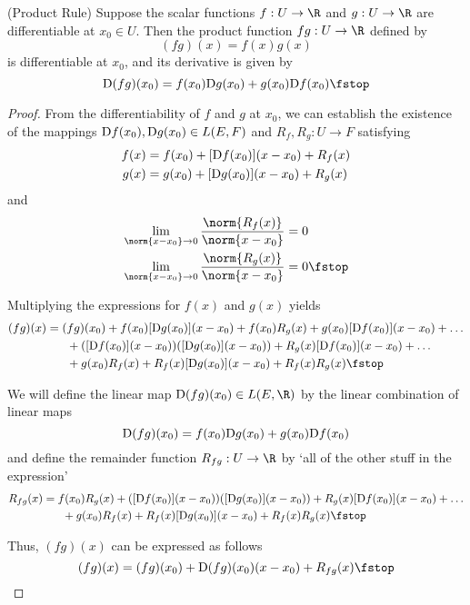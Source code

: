 \begin{theorem}
  (Product Rule) Suppose the scalar functions \( f:U\to\R \) and \( g:U\to\R \) are differentiable at \( x_0\in U \). Then the product function \( fg:U\to\R \) defined by
  \[ (fg)(x)=f(x)g(x) \]
  is differentiable at \( x_0 \), and its derivative is given by
  \[ \D(fg)(x_0)=f(x_0)\D g(x_0)+g(x_0)\D f(x_0)\fstop \]
\end{theorem}
\begin{proof}
    From the differentiability of \( f \) and \( g \) at \( x_0 \), we can establish the existence of the mappings \( \text{D} f(x_0),\text{D} g(x_0)\in L(E,F) \) and \( R_f,R_g:U\to F \) satisfying
  \begin{align*}
    f(x)&= f(x_0)+[\text{D} f(x_0)](x-x_0)+R_f(x)\\
    g(x)&= g(x_0)+[\text{D} g(x_0)](x-x_0)+R_g(x)
  \end{align*}
  and
  \begin{align*}
    \lim_{\norm{x-x_0}\to 0}\frac{\norm{R_f(x)}}{\norm{x-x_0}}&= 0\\
    \lim_{\norm{x-x_0}\to 0}\frac{\norm{R_g(x)}}{\norm{x-x_0}}&= 0\fstop
  \end{align*}

  Multiplying the expressions for \( f(x) \) and \( g(x) \) yields
  \begin{align*}
    (fg)(x)&= (fg)(x_0)+f(x_0)[\D g(x_0)](x-x_0)+f(x_0)R_g(x)+g(x_0)[\D f(x_0)](x-x_0)+\dots\\
    &\hspace{6mm}+([\D f(x_0)](x-x_0))([\D g(x_0)](x-x_0))+R_g(x)[\D f(x_0)](x-x_0)+\dots\\
    &\hspace{6mm}+g(x_0)R_f(x)+R_f(x)[\D g(x_0)](x-x_0)+R_f(x)R_g(x)\fstop
  \end{align*}

  We will define the linear map \( \D(fg)(x_0)\in L(E,\R) \) by the linear combination of linear maps
  \[ \text{D}(fg)(x_0)=f(x_0)\text{D} g(x_0)+g(x_0)\text{D} f(x_0) \]
  and define the remainder function \( R_{fg}:U\to\R \) by `all of the other stuff in the expression'
  \begin{align*}
    R_{fg}(x)&=f(x_0)R_g(x)+([\D f(x_0)](x-x_0))([\D g(x_0)](x-x_0))+R_g(x)[\D f(x_0)](x-x_0)+\dots\\
    &\hspace{6mm}+g(x_0)R_f(x)+R_f(x)[\D g(x_0)](x-x_0)+R_f(x)R_g(x)\fstop
  \end{align*}

  Thus, \( (fg)(x) \) can be expressed as follows
  \[ (fg)(x)=(fg)(x_0)+\D(fg)(x_0)(x-x_0)+R_{fg}(x)\fstop \]


\end{proof}

